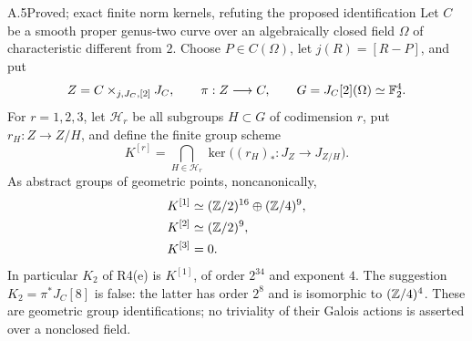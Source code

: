 \begin{claim}{A.5}{Proved; exact finite norm kernels, refuting the proposed identification}
Let $C$ be a smooth proper genus-two curve over an algebraically closed
field $\Omega$ of characteristic different from $2$. Choose $P\in C(\Omega)$,
let $j(R)=[R-P]$, and put
\[
 Z=C\times_{j,J_C,[2]}J_C,\qquad
 \pi:Z\longrightarrow C,\qquad G=J_C[2](\Omega)\simeq\mathbb F_2^4.
\]
For $r=1,2,3$, let $\mathcal H_r$ be all subgroups $H\subset G$
of codimension $r$, put $r_H:Z\to Z/H$, and define the finite
group scheme
\[
 K^{[r]}=\bigcap_{H\in\mathcal H_r}
 \ker\bigl((r_H)_*:J_Z\longrightarrow J_{Z/H}\bigr).
\]
As abstract groups of geometric points, noncanonically,
\[
 \begin{split}
 K^{[1]}&\simeq (\mathbb Z/2)^{16}\oplus(\mathbb Z/4)^9,\\
 K^{[2]}&\simeq (\mathbb Z/2)^9,\\
 K^{[3]}&=0.
 \end{split}
\]
In particular $K_2$ of R4(e) is $K^{[1]}$, of order $2^{34}$
and exponent $4$. The suggestion $K_2=\pi^*J_C[8]$ is false:
the latter has order $2^8$ and is isomorphic to $(\mathbb Z/4)^4$.
These are geometric group identifications; no triviality of their
Galois actions is asserted over a nonclosed field.
\end{claim}
